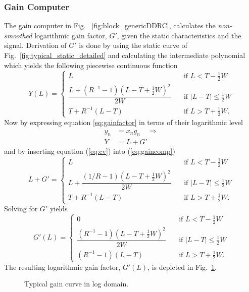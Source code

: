 \documentclass[../main2.tex]{subfiles}
\providecommand{\rootdir}{..}
\begin{document}
\subsubsection{Gain Computer} \label{gain_computer}
The gain computer in Fig. ~\ref{fig:block_genericDDRC}, calculates the \emph{non-smoothed} logarithmic gain factor, $G'$, given the static characteristics and the signal. Derivation of $G'$ is done by using the static curve of Fig.~\ref{fig:typical_static_detailed} and calculating the intermediate polynomial which yields the following piecewise continuous function
\begin{equation} \label{eq:gaincomp}
Y(L) = \begin{cases}
    L & \quad \text{if }L<T-\frac{1}{2}W \\[0.8em]
    \dfrac{L+(R^{-1}-1)(L-T+\frac{1}{2}W)^2}{2W}& \quad \text{if } |L-T| \leq \frac{1}{2}W\\[1.2em]
    T+ R^{-1}(L-T) & \quad \text{if } L > T + \frac{1}{2}W.
\end{cases}
\end{equation}
Now  by expressing equation \eqref{eq:gainfactor} in terms of their logarithmic level
\begin{align}
y_n &= x_ng_n  \quad \Rightarrow \\
Y &= L + G' \label{eq:cv}
\end{align}
and by inserting equation (\ref{eq:cv}) into (\ref{eq:gaincomp})
\begin{equation}
L+G' = \begin{cases}
    L & \quad \text{if }L < T-\frac{1}{2}W \\[0.8em]
    L + \dfrac{(1/R-1)(L-T+\frac{1}{2}W)^2}{2W}& \quad \text{if } |L-T| \leq \frac{1}{2}W\\[1.2em]
    T+ R^{-1}(L-T) & \quad \text{if } L > T + \frac{1}{2}W.
\end{cases}
\end{equation}
Solving for $G'$ yields
\begin{equation} \label{eq:c}
G'(L) = \begin{cases}
    0 & \quad \text{if }L <T -\frac{1}{2}W \\[0.8em]
    \dfrac{(R^{-1}-1)(L-T+\frac{1}{2}W)^2}{2W}& \quad \text{if } |L-T| \leq \frac{1}{2}W\\[1.2em]
    \left(R^{-1}-1\right)\left(L-T\right) & \quad \text{if } L > T + \frac{1}{2}W.
 \end{cases}
\end{equation}
The resulting logarithmic gain factor, $G'(L)$, is depicted in Fig.~\ref{fig:typical_gain_detailed}.
\begin{figure}[h]
\centerline{}
\caption{Typical gain curve in log domain.}
\label{fig:typical_gain_detailed}
\end{figure}
\end{document}
